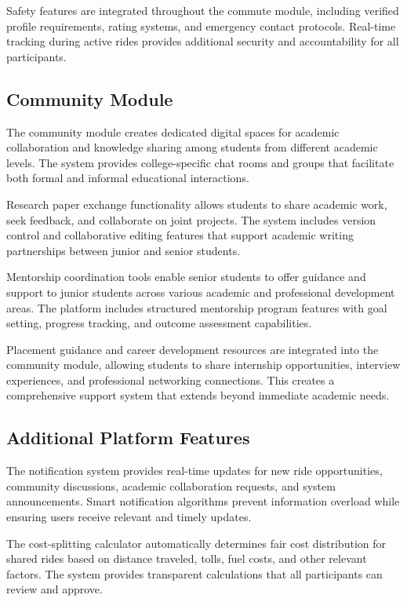 \documentclass[conference]{IEEEtran}
\begin{document}
Safety features are integrated throughout the commute module, including verified profile requirements, rating systems, and emergency contact protocols. Real-time tracking during active rides provides additional security and accountability for all participants.

\subsection{Community Module}

The community module creates dedicated digital spaces for academic collaboration and knowledge sharing among students from different academic levels. The system provides college-specific chat rooms and groups that facilitate both formal and informal educational interactions.

Research paper exchange functionality allows students to share academic work, seek feedback, and collaborate on joint projects. The system includes version control and collaborative editing features that support academic writing partnerships between junior and senior students.

Mentorship coordination tools enable senior students to offer guidance and support to junior students across various academic and professional development areas. The platform includes structured mentorship program features with goal setting, progress tracking, and outcome assessment capabilities.

Placement guidance and career development resources are integrated into the community module, allowing students to share internship opportunities, interview experiences, and professional networking connections. This creates a comprehensive support system that extends beyond immediate academic needs.

\subsection{Additional Platform Features}

The notification system provides real-time updates for new ride opportunities, community discussions, academic collaboration requests, and system announcements. Smart notification algorithms prevent information overload while ensuring users receive relevant and timely updates.

The cost-splitting calculator automatically determines fair cost distribution for shared rides based on distance traveled, tolls, fuel costs, and other relevant factors. The system provides transparent calculations that all participants can review and approve.
\end{document}
